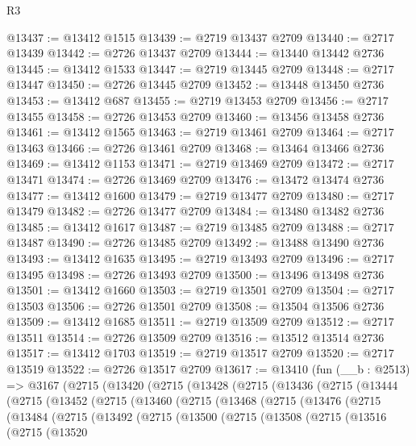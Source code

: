 \begin{lexlean}{R3}
\begin{coremodule}
@13437 := @13412 @1515
@13439 := @2719 @13437 @2709
@13440 := @2717 @13439
@13442 := @2726 @13437 @2709
@13444 := @13440 @13442 @2736
@13445 := @13412 @1533
@13447 := @2719 @13445 @2709
@13448 := @2717 @13447
@13450 := @2726 @13445 @2709
@13452 := @13448 @13450 @2736
@13453 := @13412 @687
@13455 := @2719 @13453 @2709
@13456 := @2717 @13455
@13458 := @2726 @13453 @2709
@13460 := @13456 @13458 @2736
@13461 := @13412 @1565
@13463 := @2719 @13461 @2709
@13464 := @2717 @13463
@13466 := @2726 @13461 @2709
@13468 := @13464 @13466 @2736
@13469 := @13412 @1153
@13471 := @2719 @13469 @2709
@13472 := @2717 @13471
@13474 := @2726 @13469 @2709
@13476 := @13472 @13474 @2736
@13477 := @13412 @1600
@13479 := @2719 @13477 @2709
@13480 := @2717 @13479
@13482 := @2726 @13477 @2709
@13484 := @13480 @13482 @2736
@13485 := @13412 @1617
@13487 := @2719 @13485 @2709
@13488 := @2717 @13487
@13490 := @2726 @13485 @2709
@13492 := @13488 @13490 @2736
@13493 := @13412 @1635
@13495 := @2719 @13493 @2709
@13496 := @2717 @13495
@13498 := @2726 @13493 @2709
@13500 := @13496 @13498 @2736
@13501 := @13412 @1660
@13503 := @2719 @13501 @2709
@13504 := @2717 @13503
@13506 := @2726 @13501 @2709
@13508 := @13504 @13506 @2736
@13509 := @13412 @1685
@13511 := @2719 @13509 @2709
@13512 := @2717 @13511
@13514 := @2726 @13509 @2709
@13516 := @13512 @13514 @2736
@13517 := @13412 @1703
@13519 := @2719 @13517 @2709
@13520 := @2717 @13519
@13522 := @2726 @13517 @2709
@13617 := @13410
    (fun (__b : @2513) =>
    @3167
      (@2715
        (@13420
          (@2715
            (@13428
              (@2715
                (@13436
                  (@2715
                    (@13444
                      (@2715
                        (@13452
                          (@2715
                            (@13460
                              (@2715
                                (@13468
                                  (@2715
                                    (@13476
                                      (@2715
                                        (@13484
                                          (@2715
                                            (@13492
                                              (@2715
                                                (@13500
                                                  (@2715
                                                    (@13508
                                                      (@2715
                                                        (@13516
                                                          (@2715
                                                            (@13520

\end{coremodule}
\end{lexlean}
